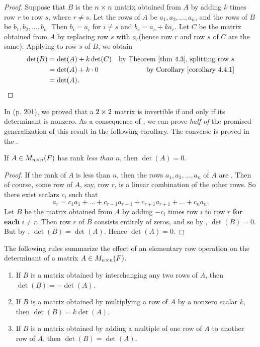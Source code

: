 \begin{proof}
Suppose that \(B\) is the \(n \times n\) matrix obtained from \(A\) by adding \(k\) times row \(r\) to row \(s\), where \(r \ne s\).
Let the rows of \(A\) be \(a_1, a_2, ..., a_n\), and the rows of \(B\) be \(b_1, b_2, ..., b_n\).
Then \(b_i = a_i\) for \(i \ne s\) and \(b_s = a_s + k a_r\).
Let \(C\) be the matrix obtained from \(A\) by replacing row \(s\) with \(a_r\)(hence row \(r\) and row \(s\) of \(C\) are the same).
Applying  to row \(s\) of \(B\), we obtain
\begin{align*}
    \det(B) & = \det(A) + k \det(C) & \text{by \THM{4.3}, splitting row \(s\)} \\ 
            & = \det(A) + k \cdot 0 & \text{by \CORO{4.4.1}} \\
            & = \det(A).
\end{align*}
\end{proof}

In  (p. 201), we proved that a \(2 \times 2\) matrix is invertible if and only if its determinant is nonzero.
As a consequence of , we can prove \emph{half of} the promised generalization of this result in the following corollary.
The converse is proved in the .

\begin{corollary} \label{corollary 4.6.1}
If \(A \in M_{n \times n}(F)\) has rank \emph{less than} \(n\), then \(\det(A) = 0\).
\end{corollary}

\begin{proof}
If the rank of \(A\) is less than \(n\), then the rows \(a_1, a_2, ..., a_n\) of \(A\) are \LDP{}.
Then of course, some row of \(A\), say, row \(r\), is a linear combination of the other rows.
So there exist scalars \(c_i\) such that
\[
    a_r = c_1 a_1 + ... + c_{r - 1} a_{r - 1} + c_{r + 1} a_{r + 1} + ... + c_n a_n.
\]
Let \(B\) be the matrix obtained from \(A\) by adding \(-c_i\) times row \(i\) to row \(r\) \textbf{for each} \(i \ne r\).
Then row \(r\) of \(B\) consists entirely of zeros, and so by , \(\det(B) = 0\).
But by , \(\det(B) = \det(A)\).
Hence \(\det(A) = 0\).
\end{proof}

\begin{remark} \label{remark 4.2.3}
The following rules summarize the effect of an elementary row operation on the determinant of a matrix \(A \in M_{n \times n}(F)\).
\begin{enumerate}
\item If \(B\) is a matrix obtained by interchanging any two rows of \(A\), then \(\det(B) = -\det(A)\).
\item If \(B\) is a matrix obtained by multiplying a row of \(A\) by a nonzero scalar \(k\), then \(\det(B) = k\det(A)\).
\item If \(B\) is a matrix obtained by adding a multiple of one row of \(A\) to another row of \(A\), then \(\det(B) = \det(A)\).
\end{enumerate}
\end{remark}

